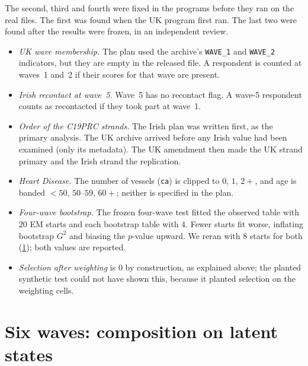 \documentclass[11pt]{article}
\theoremstyle{definition}
\theoremstyle{remark}
\begin{document}
The second, third and fourth were fixed in the programs before they ran on the real files. The first was found when the UK program
first ran. The last two were found after the results were frozen, in an independent review.
\begin{itemize}[leftmargin=*,nosep]
\item \emph{UK wave membership.} The plan used the archive's \texttt{WAVE\_1} and \texttt{WAVE\_2} indicators, but they are empty in the
  released file. A respondent is counted at waves~1 and~2 if their scores for that wave are present.
\item \emph{Irish recontact at wave~5.} Wave~5 has no recontact flag. A wave-5 respondent counts as recontacted if they took part at
  wave~1.
\item \emph{Order of the C19PRC strands.} The Irish plan was written first, as the primary analysis. The UK archive arrived before any
  Irish value had been examined (only its metadata). The UK amendment then made the UK strand primary and the Irish strand the
  replication.
\item \emph{Heart Disease.} The number of vessels (\texttt{ca}) is clipped to $0$, $1$, $2+$, and age is banded $<50$, $50$--$59$,
  $60+$; neither is specified in the plan.
\item \emph{Four-wave bootstrap.} The frozen four-wave test fitted the observed table with $20$ EM starts and each bootstrap table with
  $4$. Fewer starts fit worse, inflating bootstrap $G^2$ and biasing the $p$-value upward. We reran with $8$ starts for both
  (\cref{sec:panels6}); both values are reported.
\item \emph{Selection after weighting} is $0$ by construction, as explained above; the planted synthetic test could not have shown this,
  because it planted selection on the weighting cells.
\end{itemize}

\section{Six waves: composition on latent states}\label{sec:panels6}
\end{document}
